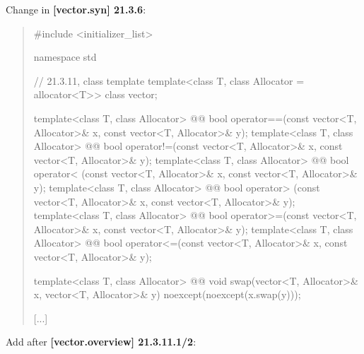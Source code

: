 \documentclass{wg21}
\begin{document}
Change in \textbf{[vector.syn] 21.3.6}:
\begin{quote}
\begin{codeblock}
#include <initializer_list>

namespace std {
  // 21.3.11, class template 
  template<class T, class Allocator = allocator<T>> class vector;

  template<class T, class Allocator>
    @@ bool operator==(const vector<T, Allocator>& x, const vector<T, Allocator>& y);
  template<class T, class Allocator>
    @@ bool operator!=(const vector<T, Allocator>& x, const vector<T, Allocator>& y);
  template<class T, class Allocator>
    @@ bool operator< (const vector<T, Allocator>& x, const vector<T, Allocator>& y);
  template<class T, class Allocator>
    @@ bool operator> (const vector<T, Allocator>& x, const vector<T, Allocator>& y);
  template<class T, class Allocator>
    @@ bool operator>=(const vector<T, Allocator>& x, const vector<T, Allocator>& y);
  template<class T, class Allocator>
    @@ bool operator<=(const vector<T, Allocator>& x, const vector<T, Allocator>& y);

  template<class T, class Allocator>
    @@ void swap(vector<T, Allocator>& x, vector<T, Allocator>& y)
      noexcept(noexcept(x.swap(y)));

  [...]
}
\end{codeblock}
\end{quote}

Add after \textbf{[vector.overview] 21.3.11.1/2}:
\begin{quote}
\end{quote}
\end{document}
